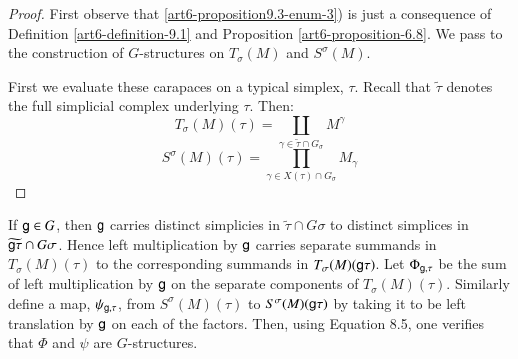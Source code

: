 \begin{proof}
First observe that \ref{art6-proposition9.3-enum-3}) is just a consequence of Definition \ref{art6-definition-9.1} and Proposition \ref{art6-proposition-6.8}. We pass to the construction of $G$-structures on $T_{\sigma}(M)$ and $S^{\sigma}(M)$.

First we evaluate these carapaces on a typical simplex, $\tau$. Recall that $\tilde{\tau}$ denotes the full simplicial complex underlying $\tau$. Then:
$$
T_{\sigma}(M)(\tau) = \coprod_{\gamma \in \tilde{\tau}\cap G_{\sigma}}M^{\gamma}
$$
\begin{equation}\label{art6-eq-9.4}
S^{\sigma}(M)(\tau) = \prod_{\gamma \in X (\tau) \cap G_{\sigma}} M_{\gamma}
\end{equation}
\end{proof}

If $\mathsf{g} \in G$, then $\mathsf{g}$ carries distinct simplicies in $\tilde{\tau} \cap G\sigma$ to distinct simplices in $\widetilde{\mathsf{g} \tau}\cap G\sigma$. Hence left multiplication by $\mathsf{g}$ carries separate summands in $T_{\sigma}(M)(\tau)$ to the corresponding summands in $T_{\sigma}(M)(\mathsf{g} \tau)$. Let $\Phi_{\mathsf{g}, \tau}$ be the sum of left multiplication by $\mathsf{g}$ on the separate components of $T_{\sigma}(M)(\tau)$. Similarly define a map, $\psi_{\mathsf{g}, \tau}$, from $S^{\sigma}(M)(\tau)$ to $S^{\sigma}(M)(\mathsf{g} \tau)$ by taking it to be left translation by $\mathsf{g}$ on each of the factors. Then, using Equation 8.5, one verifies that $\Phi$ and $\psi$ are $G$-structures.

